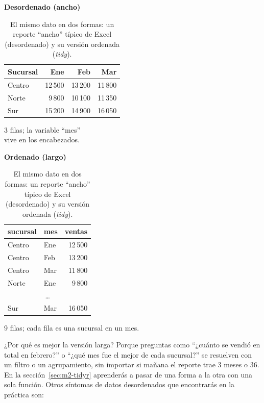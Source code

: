 \begin{table}[H]
\centering
\caption{El mismo dato en dos formas: un reporte ``ancho'' típico de Excel
(desordenado) y su versión ordenada (\emph{tidy}).}
\label{tab:m2-tidy}
\begin{minipage}[t]{0.44\textwidth}
\centering
\textbf{\sffamily\small\color{peligro}Desordenado (ancho)}\\[4pt]
\small
\begin{tabular}{lrrr}
\toprule
Sucursal & Ene & Feb & Mar \\
\midrule
Centro & 12\,500 & 13\,200 & 11\,800 \\
Norte  &  9\,800 & 10\,100 & 11\,350 \\
Sur    & 15\,200 & 14\,900 & 16\,050 \\
\bottomrule
\end{tabular}

\smallskip
{\footnotesize\color{gristexto} 3 filas; la variable ``mes''\\ vive en los
encabezados.}
\end{minipage}%
\hfill
\begin{minipage}[t]{0.48\textwidth}
\centering
\textbf{\sffamily\small\color{exito}Ordenado (largo)}\\[4pt]
\small
\begin{tabular}{llr}
\toprule
sucursal & mes & ventas \\
\midrule
Centro & Ene & 12\,500 \\
Centro & Feb & 13\,200 \\
Centro & Mar & 11\,800 \\
Norte  & Ene &  9\,800 \\
\multicolumn{3}{c}{\ldots} \\
Sur    & Mar & 16\,050 \\
\bottomrule
\end{tabular}

\smallskip
{\footnotesize\color{gristexto} 9 filas; cada fila es una sucursal en un mes.}
\end{minipage}
\end{table}

¿Por qué es mejor la versión larga? Porque preguntas como ``¿cuánto se vendió
en total en febrero?'' o ``¿qué mes fue el mejor de cada sucursal?'' se
resuelven con un filtro o un agrupamiento, sin importar si mañana el reporte
trae 3 meses o 36. En la sección~\ref{sec:m2-tidyr} aprenderás a pasar de una
forma a la otra con una sola función. Otros síntomas de datos desordenados que
encontrarás en la práctica son:

